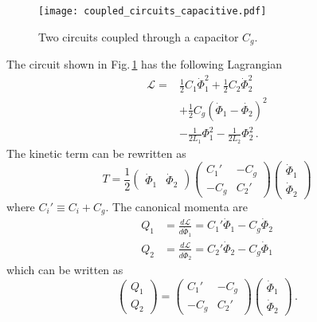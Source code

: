 

\begin{figure}
\begin{centering}
\texttt{[image: coupled\_circuits\_capacitive.pdf]}
\par\end{centering}
\caption{Two circuits coupled through a capacitor $C_g$.}
\label{Fig:coupledCircuits_capacitive}
\end{figure}

The circuit shown in Fig.\,\ref{Fig:coupledCircuits_capacitive} has the following Lagrangian
\begin{align}
  \mathcal{L} = & \frac{1}{2}C_1\dot{\Phi}_1^2 + \frac{1}{2}C_2\dot{\Phi}_2^2 \nonumber \\
  & + \frac{1}{2}C_g \left( \dot{\Phi}_1 - \dot{\Phi_2} \right)^2 \nonumber \\
  & - \frac{1}{2L_1}\Phi_1^2 - \frac{1}{2L_2}\Phi_2^2 \, .
\end{align}
The kinetic term can be rewritten as
\begin{equation}
  T = \frac{1}{2}
  \left( \begin{array}{cc} \dot{\Phi}_1 & \dot{\Phi}_2 \end{array} \right)
  \left( \begin{array}{cc} C_1' & -C_g \\ -C_g & C_2' \end{array} \right)
  \left( \begin{array}{c} \dot{\Phi}_1 \\ \dot{\Phi}_2 \end{array} \right) \label{eq:kineticInFlux}
\end{equation}
where $C_i' \equiv C_i + C_g$.
The canonical momenta are
\begin{align}
  Q_1 &= \frac{d \mathcal{L}}{d\dot{\Phi}_1} = C_1'\dot{\Phi}_1 - C_g\dot{\Phi}_2 \nonumber \\
  Q_2 &= \frac{d \mathcal{L}}{d\dot{\Phi}_2} = C_2'\dot{\Phi}_2 - C_g\dot{\Phi}_1
\end{align}
which can be written as
\begin{equation}
  \left( \begin{array}{c} Q_1 \\ Q_2 \end{array} \right) =
  \left( \begin{array}{cc} C_1' & -C_g \\ -C_g & C_2' \end{array} \right)
  \left( \begin{array}{c} \dot{\Phi}_1 \\ \dot{\Phi}_2 \end{array} \right)
  \, .
\end{equation}
